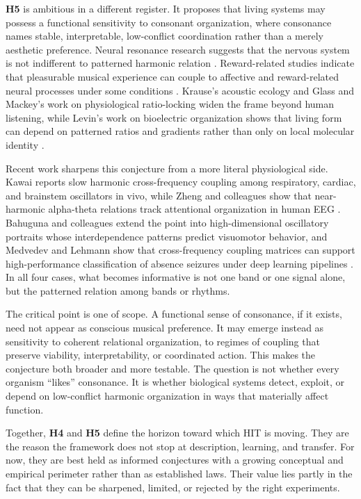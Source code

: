 \textbf{H5} is ambitious in a different register. It proposes that living systems may possess a functional sensitivity to consonant organization, where consonance names stable, interpretable, low-conflict coordination rather than a merely aesthetic preference. Neural resonance research suggests that the nervous system is not indifferent to patterned harmonic relation \parencite{large_2012}. Reward-related studies indicate that pleasurable musical experience can couple to affective and reward-related neural processes under some conditions \parencite{blood_2001}. Krause's acoustic ecology and Glass and Mackey's work on physiological ratio-locking widen the frame beyond human listening, while Levin's work on bioelectric organization shows that living form can depend on patterned ratios and gradients rather than only on local molecular identity \parencite{glass_1988, krause_2013, levin_2021}.

Recent work sharpens this conjecture from a more literal physiological side. Kawai reports slow harmonic cross-frequency coupling among respiratory, cardiac, and brainstem oscillators in vivo, while Zheng and colleagues show that near-harmonic alpha-theta relations track attentional organization in human EEG \parencite{kawai_2023, zheng_2025}. Bahuguna and colleagues extend the point into high-dimensional oscillatory portraits whose interdependence patterns predict visuomotor behavior, and Medvedev and Lehmann show that cross-frequency coupling matrices can support high-performance classification of absence seizures under deep learning pipelines \parencite{bahuguna_2025, medvedev_2025}. In all four cases, what becomes informative is not one band or one signal alone, but the patterned relation among bands or rhythms.

The critical point is one of scope. A functional sense of consonance, if it exists, need not appear as conscious musical preference. It may emerge instead as sensitivity to coherent relational organization, to regimes of coupling that preserve viability, interpretability, or coordinated action. This makes the conjecture both broader and more testable. The question is not whether every organism \enquote{likes} consonance. It is whether biological systems detect, exploit, or depend on low-conflict harmonic organization in ways that materially affect function.

Together, \textbf{H4} and \textbf{H5} define the horizon toward which HIT is moving. They are the reason the framework does not stop at description, learning, and transfer. For now, they are best held as informed conjectures with a growing conceptual and empirical perimeter rather than as established laws. Their value lies partly in the fact that they can be sharpened, limited, or rejected by the right experiments.


